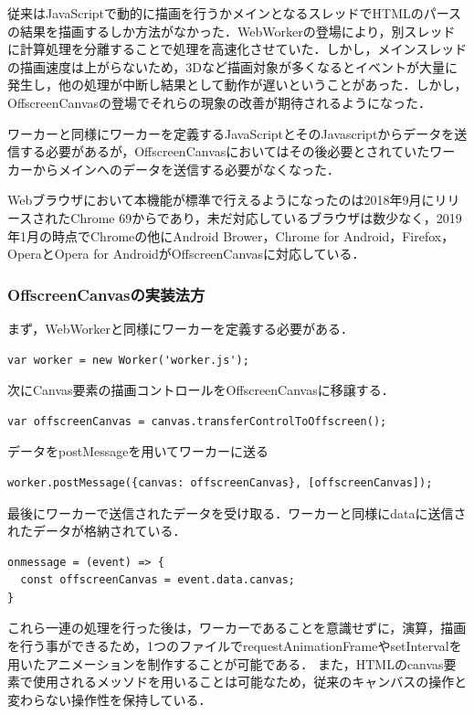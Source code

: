 \documentclass[a4j,12pt]{jsarticle}
\begin{document}
従来はJavaScriptで動的に描画を行うかメインとなるスレッドでHTMLのパースの結果を描画するしか方法がなかった．WebWorkerの登場により，別スレッドに計算処理を分離することで処理を高速化させていた．しかし，メインスレッドの描画速度は上がらないため，3Dなど描画対象が多くなるとイベントが大量に発生し，他の処理が中断し結果として動作が遅いということがあった．しかし，OffscreenCanvasの登場でそれらの現象の改善が期待されるようになった．

ワーカーと同様にワーカーを定義するJavaScriptとそのJavascriptからデータを送信する必要があるが，OffscreenCanvasにおいてはその後必要とされていたワーカーからメインへのデータを送信する必要がなくなった．

Webブラウザにおいて本機能が標準で行えるようになったのは2018年9月にリリースされたChrome 69からであり，未だ対応しているブラウザは数少なく，2019年1月の時点でChromeの他にAndroid Brower，Chrome for Android，Firefox，OperaとOpera for AndroidがOffscreenCanvasに対応している．

\subsubsection{OffscreenCanvasの実装法方}
まず，WebWorkerと同様にワーカーを定義する必要がある．
\begin{lstlisting}[basicstyle=\ttfamily\footnotesize, frame=single]
var worker = new Worker('worker.js');
 \end{lstlisting}
 
 次にCanvas要素の描画コントロールをOffscreenCanvasに移譲する．
 \begin{lstlisting}[basicstyle=\ttfamily\footnotesize, frame=single]
var offscreenCanvas = canvas.transferControlToOffscreen();
 \end{lstlisting}
 
 データをpostMessageを用いてワーカーに送る
 \begin{lstlisting}[basicstyle=\ttfamily\footnotesize, frame=single]
worker.postMessage({canvas: offscreenCanvas}, [offscreenCanvas]);
 \end{lstlisting}
 
 最後にワーカーで送信されたデータを受け取る．ワーカーと同様にdataに送信されたデータが格納されている．
  \begin{lstlisting}[basicstyle=\ttfamily\footnotesize, frame=single]
 onmessage = (event) => {
  const offscreenCanvas = event.data.canvas;
}
 \end{lstlisting} 
これら一連の処理を行った後は，ワーカーであることを意識せずに，演算，描画を行う事ができるため，1つのファイルでrequestAnimationFrameやsetIntervalを用いたアニメーションを制作することが可能である．
また，HTMLのcanvas要素で使用されるメッソドを用いることは可能なため，従来のキャンバスの操作と変わらない操作性を保持している．
\end{document}
